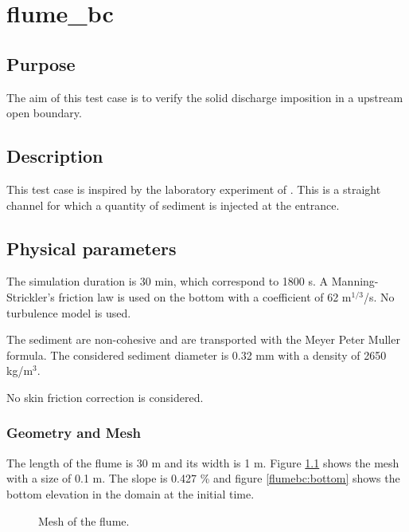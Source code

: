 \chapter{flume\_bc}
%

%
\section{Purpose}

The aim of this test case is to verify the solid discharge imposition in a upstream open boundary.

\section{Description}

This test case is inspired by the laboratory experiment of \cite{soni1981laboratory}. This is a straight channel for which a quantity of sediment is injected at the entrance.

\section{Physical parameters}

The simulation duration is 30 min, which correspond to 1800 s.
%
A Manning-Strickler's friction law is used on the bottom with a coefficient of 62 m$^{1/3}$/s.
%
No turbulence model is used.

The sediment are non-cohesive and are transported with the Meyer Peter Muller formula. The considered sediment diameter is 0.32 mm with a density of 2650 kg/m$^3$.

No skin friction correction is considered.

\subsection{Geometry and Mesh}
%
The length of the flume is 30 m and its width is 1 m. Figure \ref{flumebc:mesh} shows the mesh with a size of 0.1 m. The slope is 0.427 \% and figure \ref{flumebc:bottom} shows the bottom elevation in the domain at the initial time.

\begin{figure}[H]
 \centering
 \caption{Mesh of the flume.}
 \label{flumebc:mesh}
\end{figure}

